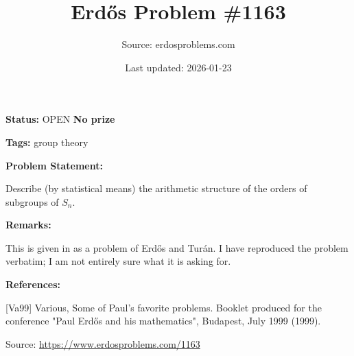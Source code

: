 \documentclass{article}
\title{Erd\H{o}s Problem \#1163}
\date{Last updated: 2026-01-23}
\author{Source: erdosproblems.com}
\begin{document}
\maketitle

\noindent\textbf{Status:} OPEN \quad \textbf{No prize}

\noindent\textbf{Tags:} group theory

\medskip
\noindent\textbf{Problem Statement:}

Describe (by statistical means) the arithmetic structure of the orders of subgroups of $S_n$.

\bigskip
\noindent\textbf{Remarks:}

This is given in \cite{Va99} as a problem of Erd\H{o}s and Tur\'{a}n. I have reproduced the problem verbatim; I am not entirely sure what it is asking for.

\bigskip
\noindent\textbf{References:}

[Va99] Various, Some of Paul's favorite problems. Booklet produced for the conference "Paul Erd\H{o}s and his mathematics", Budapest, July 1999 (1999).

\bigskip
\noindent\small{Source: \url{https://www.erdosproblems.com/1163}}
\end{document}
